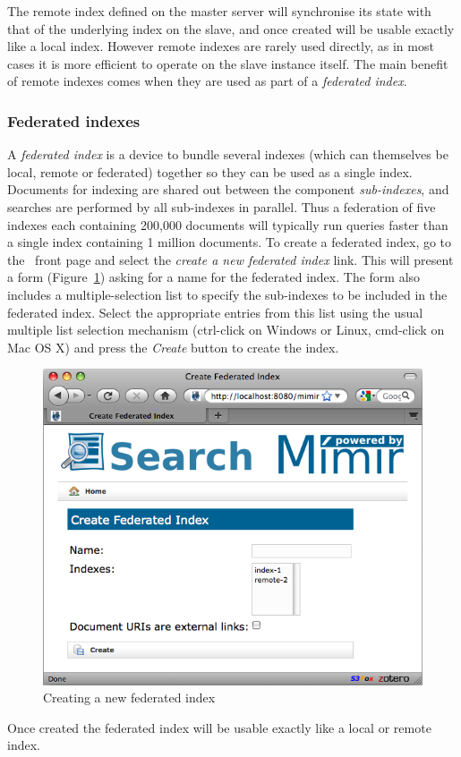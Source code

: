 The remote index defined on the master server will synchronise its state with
that of the underlying index on the slave, and once created will be usable
exactly like a local index.  However remote indexes are rarely used directly,
as in most cases it is more efficient to operate on the slave instance
itself.  The main benefit of remote indexes comes when they are used as part
of a {\em federated index}.

\subsubsection{Federated indexes}

A {\em federated index} is a device to bundle several indexes (which can
themselves be local, remote or federated) together so they can be used as a
single index.  Documents for indexing are shared out between the component
{\em sub-indexes}, and searches are performed by all sub-indexes in parallel.
Thus a federation of five indexes each containing 200,000 documents will
typically run queries faster than a single index containing 1 million
documents.  To create a federated index, go to the \Mimir\ front page and
select the {\em create a new federated index} link.  This will present a form
(Figure~\ref{fig:new-federated-index}) asking for a name for the federated
index.  The form also includes a multiple-selection list to specify the
sub-indexes to be included in the federated index.  Select the appropriate
entries from this list using the usual multiple list selection mechanism
(ctrl-click on Windows or Linux, cmd-click on Mac OS X) and press the
{\em Create} button to create the index.
%
\begin{figure}[htb!]
\begin{center}
\includegraphics[scale=0.5]{img/new-federated-index}
\end{center}
\caption{Creating a new federated index}
\label{fig:new-federated-index}
\end{figure}
%
Once created the federated index will be usable exactly like a local or remote
index.

